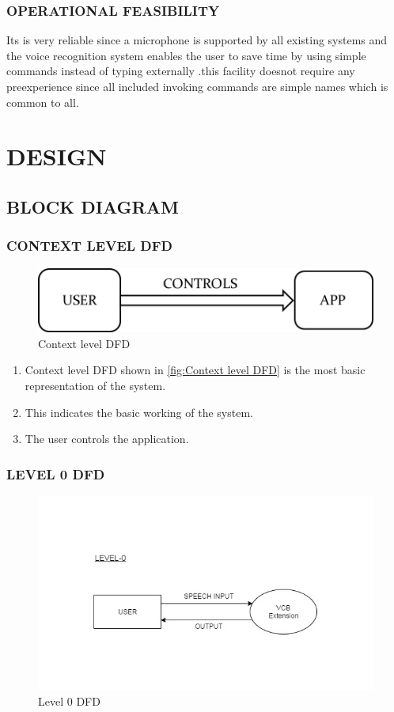 \documentclass[12pt]{report} %
\begin{document}
\subsection{OPERATIONAL FEASIBILITY}
\label{subsec:OPERATIONAL FEASIBILITY}
Its is very reliable since a microphone is supported by all existing systems and the voice recognition system enables the user to save time by using simple commands instead of typing externally .this facility doesnot  require  any preexperience since all included invoking commands are simple names which is common to all.


\chapter{DESIGN}
\label{cha:DESIGN}


\section{BLOCK DIAGRAM}
\label{sec:DATA FLOW DIAGRAMS}

\subsection{CONTEXT LEVEL DFD}
\label{subsec:CONTEXT LEVEL DFD}

\begin{figure}[h]
	\centering
	\includegraphics[width=0.5\linewidth]{figures/context_level_DFD.png}
	\caption{Context level DFD}
	\label{fig:Context level DFD}
\end{figure}


\begin{enumerate}
	\item Context level DFD shown in \autoref{fig:Context level DFD} is the most basic representation of the system.
	\item This indicates the basic working of the system.
	\item The user controls the application.
\end{enumerate}


\subsection{LEVEL 0 DFD}
\label{subsec:LEVEL 0 DFD}
\begin{figure}[h]
	\centering
	\includegraphics[width=0.5\linewidth]{figures/DFD0.jpg}
	\caption{Level 0 DFD}
	\label{fig:Level 0 DFD}
\end{figure}
\end{document}
